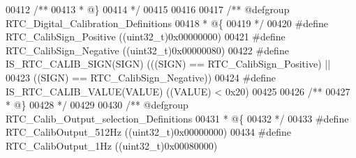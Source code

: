 \begin{DoxyCode}
00412 \textcolor{comment}{/**}
00413 \textcolor{comment}{  * @\}}
00414 \textcolor{comment}{  */}
00415 
00416 
00417 \textcolor{comment}{/** @defgroup RTC\_Digital\_Calibration\_Definitions }
00418 \textcolor{comment}{  * @\{}
00419 \textcolor{comment}{  */}
00420 \textcolor{preprocessor}{#}\textcolor{preprocessor}{define} \textcolor{preprocessor}{RTC\_CalibSign\_Positive}            \textcolor{preprocessor}{(}\textcolor{preprocessor}{(}\textcolor{preprocessor}{uint32\_t}\textcolor{preprocessor}{)}0x00000000\textcolor{preprocessor}{)}
00421 \textcolor{preprocessor}{#}\textcolor{preprocessor}{define} \textcolor{preprocessor}{RTC\_CalibSign\_Negative}            \textcolor{preprocessor}{(}\textcolor{preprocessor}{(}\textcolor{preprocessor}{uint32\_t}\textcolor{preprocessor}{)}0x00000080\textcolor{preprocessor}{)}
00422 \textcolor{preprocessor}{#}\textcolor{preprocessor}{define} \textcolor{preprocessor}{IS\_RTC\_CALIB\_SIGN}\textcolor{preprocessor}{(}\textcolor{preprocessor}{SIGN}\textcolor{preprocessor}{)} \textcolor{preprocessor}{(}\textcolor{preprocessor}{(}\textcolor{preprocessor}{(}\textcolor{preprocessor}{SIGN}\textcolor{preprocessor}{)} \textcolor{preprocessor}{==} RTC_CalibSign_Positive\textcolor{preprocessor}{)} \textcolor{preprocessor}{||}
00423                                  \textcolor{preprocessor}{(}\textcolor{preprocessor}{(}\textcolor{preprocessor}{SIGN}\textcolor{preprocessor}{)} \textcolor{preprocessor}{==} RTC_CalibSign_Negative\textcolor{preprocessor}{)}\textcolor{preprocessor}{)}
00424 \textcolor{preprocessor}{#}\textcolor{preprocessor}{define} \textcolor{preprocessor}{IS\_RTC\_CALIB\_VALUE}\textcolor{preprocessor}{(}\textcolor{preprocessor}{VALUE}\textcolor{preprocessor}{)} \textcolor{preprocessor}{(}\textcolor{preprocessor}{(}\textcolor{preprocessor}{VALUE}\textcolor{preprocessor}{)} \textcolor{preprocessor}{<} 0x20\textcolor{preprocessor}{)}
00425 
00426 \textcolor{comment}{/**}
00427 \textcolor{comment}{  * @\}}
00428 \textcolor{comment}{  */}
00429 
00430  \textcolor{comment}{/** @defgroup RTC\_Calib\_Output\_selection\_Definitions }
00431 \textcolor{comment}{  * @\{}
00432 \textcolor{comment}{  */}
00433 \textcolor{preprocessor}{#}\textcolor{preprocessor}{define} \textcolor{preprocessor}{RTC\_CalibOutput\_512Hz}            \textcolor{preprocessor}{(}\textcolor{preprocessor}{(}\textcolor{preprocessor}{uint32\_t}\textcolor{preprocessor}{)}0x00000000\textcolor{preprocessor}{)}
00434 \textcolor{preprocessor}{#}\textcolor{preprocessor}{define} \textcolor{preprocessor}{RTC\_CalibOutput\_1Hz}              \textcolor{preprocessor}{(}\textcolor{preprocessor}{(}\textcolor{preprocessor}{uint32\_t}\textcolor{preprocessor}{)}0x00080000\textcolor{preprocessor}{)}

\end{DoxyCode}
